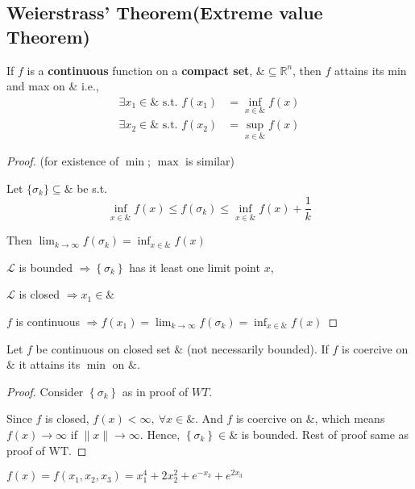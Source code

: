 \documentclass[11pt]{elegantbook}
\begin{document}
\subsection{Weierstrass' Theorem(Extreme value Theorem)}
\begin{theorem}
    \quad

    If $f$ is a \textbf{continuous} function on a \textbf{compact set}, $\& \subseteq \mathbb{R}^{n}$, then $f$ attains its min and max on $\&$ i.e.,
    $$
    \begin{aligned}
    \exists x_1 \in \& \text { s.t. } f\left(x_{1}\right) &=\inf _{x \in \&} f(x) \\
    \exists x_{2} \in \& \text { s.t. } f\left(x_{2}\right) &=\sup _{x \in \&} f(x)
    \end{aligned}
    $$
\end{theorem}
\begin{proof}
    (for existence of $\min$; $\max$ is similar)

    Let $\{\sigma_k\}\subseteq \&$ be s.t.
    $$\inf_{x\in\&} f(x) \leq f\left(\sigma_{k}\right) \leq \inf _{x \in \&} f(x)+\frac{1}{k}$$

    Then $\lim _{k \rightarrow \infty} f\left(\sigma_{k}\right)=\inf_{x\in\&} f(x)$

    $\mathcal{L}$ is bounded $\Rightarrow\left\{\sigma_{k}\right\}$ has it least one limit point $x$,

    $\mathcal{L}$ is closed $\Rightarrow x_{1} \in \&$

    $f$ is continuous $\Rightarrow f\left(x_{1}\right)=\lim _{k \rightarrow \infty} f\left(\sigma_{k}\right)=\inf _{x \in \&} f(x)$
\end{proof}

\begin{corollary}[Corollary to WT]
    Let $f$ be continuous on closed set $\&$ (not necessarily bounded). If $f$ is coercive on $\&$ it attains its $\min$ on $\&$.
\end{corollary}
\begin{proof}
    Consider $\left\{\sigma_{k}\right\}$ as in proof of $WT$.

    Since $f$ is closed, $f(x)<\infty,\ \forall x\in\&$. And $f$ is coercive on $\&$, which means $f(x)\rightarrow \infty$ if $\|x\| \rightarrow\infty$. Hence, $\left\{\sigma_{k}\right\}\in\&$ is bounded. Rest of proof same as proof of $\mathrm{WT}$.
\end{proof}

\begin{example}
    $f(x)=f\left(x_{1}, x_{2}, x_{3}\right)=x_{1}^{4}+2 x_{2}^{2}+e^{-x_{3}}+e^{2 x_{3}}$
\end{example}
\end{document}
